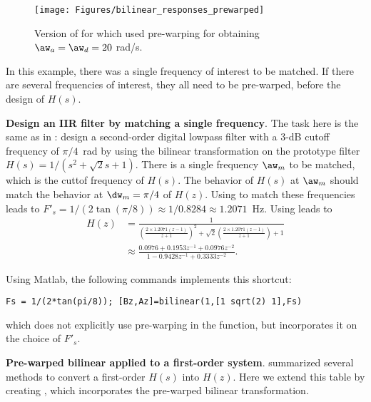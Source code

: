 \begin{figure}
\centering
\texttt{[image: Figures/bilinear\_responses\_prewarped]}
\caption{Version of  for which  used pre-warping for obtaining $\aw_a=\aw_d=20$ rad/s.\label{fig:bilinear_responses_prewarped}}
\end{figure}

In this example, there was a single frequency of interest to be matched. If there are several frequencies of interest, they all need to be pre-warped, before the design of $H(s)$.
\eExample



\bExample \textbf{Design an IIR filter by matching a single frequency}.
The task here is the same as in : design a second-order digital lowpass filter with a 3-dB cutoff frequency
of $\pi/4$~rad by using the bilinear transformation on the prototype filter $H(s)=1/(s^2 + \sqrt{2}s + 1)$.
There is a single frequency 
$\aw_m$ to be matched, which is the cuttof frequency of $H(s)$. The behavior of $H(s)$ at $\aw_m$ should match the behavior at $\dw_m = \pi/4$ of $H(z)$.
Using  to match these frequencies leads to $F'_s = 1/(2 \tan(\pi/8)) \approx 1/0.8284 \approx 1.2071$~Hz. Using  leads to
\begin{align*}
H(z) &= \frac{1}{ \left( \frac{2 \times 1.2071 (z-1)}{z+1} \right)^2 + \sqrt{2} \left( \frac{2 \times 1.2071 (z-1)}{z+1} \right) + 1} \\
 &\approx \frac{0.0976 + 0.1953z^{-1} + 0.0976 z^{-2} }{1   -0.9428 z^{-1} +    0.3333 z^{-2} }.
\end{align*}

Using Matlab, the following commands implements this shortcut:
\begin{lstlisting}
Fs = 1/(2*tan(pi/8)); [Bz,Az]=bilinear(1,[1 sqrt(2) 1],Fs)
\end{lstlisting}
which does not explicitly use pre-warping in the  function, but
incorporates it on the choice of $F'_s$.
\eExample

\bExample \textbf{Pre-warped bilinear applied to a first-order system}.
 summarized several methods to convert a first-order $H(s)$ into $H(z)$.
Here we extend this table by creating , which incorporates the pre-warped bilinear transformation.

